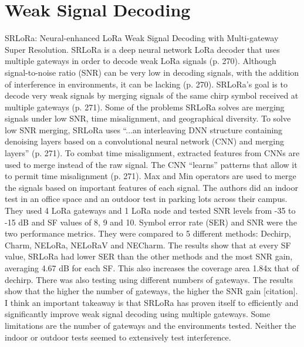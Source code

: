 \documentclass[sigsmall]{acmart}
\begin{document}
\section*{Weak Signal Decoding}
SRLoRa: Neural-enhanced LoRa Weak Signal Decoding with Multi-gateway Super Resolution. SRLoRa is a deep neural network LoRa decoder that uses multiple gateways in order to decode weak LoRa signals (p. 270). Although signal-to-noise ratio (SNR) can be very low in decoding signals, with the addition of interference in environments, it can be lacking (p. 270). SRLoRa’s goal is to decode very weak signals by merging signals of the same chirp symbol received at multiple gateways (p. 271). Some of the problems SRLoRa solves are merging signals under low SNR, time misalignment, and geographical diversity. To solve low SNR merging, SRLoRa uses “...an interleaving DNN structure containing denoising layers based on a convolutional neural network (CNN) and merging layers” (p. 271). To combat time misalignment, extracted features from CNNs are used to merge instead of the raw signal. The CNN “learns” patterns that allow it to permit time misalignment (p. 271). Max and Min operators are used to merge the signals based on important features of each signal. The authors did an indoor test in an office space and an outdoor test in parking lots across their campus. They used 4 LoRa gateways and 1 LoRa node and tested SNR levels from -35 to -15 dB and SF values of 8, 9 and 10. Symbol error rate (SER) and SNR were the two performance metrics. They were compared to 5 different methods: Dechirp, Charm, NELoRa, NELoRaV and NECharm. The results show that at every SF value, SRLoRa had lower SER than the other methods and the most SNR gain, averaging 4.67 dB for each SF. This also increases the coverage area 1.84x that of dechirp. There was also testing using different numbers of gateways. The results show that the higher the number of gateways, the higher the SNR gain [citation]. I think an important takeaway is that SRLoRa has proven itself to efficiently and significantly improve weak signal decoding using multiple gateways. Some limitations are the number of gateways and the environments tested. Neither the indoor or outdoor tests seemed to extensively test interference.
\end{document}
